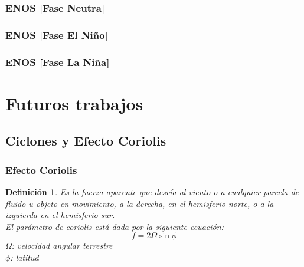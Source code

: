 \documentclass{beamer}
\newtheorem{Th1}{Reseña Historica}
\newtheorem{Th2}{Definición}
\begin{document}
	\begin{frame}
		\frametitle{ENOS [Fase Neutra]}
		\begin{figure}[!hbt]
		   \centering
		\end{figure}
	\end{frame}

	\begin{frame}
		\frametitle{ENOS [Fase El Niño]}
		\begin{figure}[!hbt]
		   \centering
		\end{figure}
	\end{frame}

	\begin{frame}
		\frametitle{ENOS [Fase La Niña]}
		\begin{figure}[!hbt]
		   \centering
		\end{figure}
	\end{frame}

	\section{Futuros trabajos}
	\subsection{Ciclones y Efecto Coriolis }
	\begin{frame}
		\frametitle{Efecto Coriolis}
		\begin{Th2}
		Es la fuerza aparente que desvía al viento o a cualquier parcela de fluido u objeto en
		movimiento, a la derecha, en el hemisferio norte, o a la izquierda en el hemisferio sur.\\
		El parámetro de coriolis está dada por la siguiente ecuación: 
			\begin{equation}
				f=2\Omega\sin\phi
			\end{equation}
			$\Omega$: velocidad angular terrestre \\
			$\phi$: latitud
		\end{Th2}
	\end{frame} 
\end{document}
